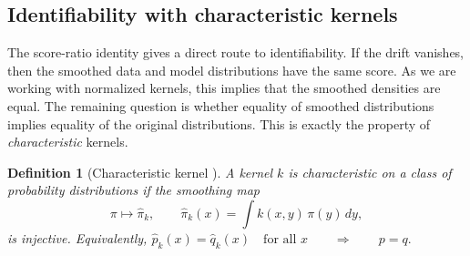 \documentclass{article}
\theoremstyle{plain}
\newtheorem{definition}[theorem]{Definition}
\begin{document}


\subsection{Identifiability with characteristic kernels}

The score-ratio identity gives a direct route to identifiability. If the drift
vanishes, then the smoothed data and model distributions have the same score. As we are working with normalized kernels, this implies that the smoothed densities are equal. The remaining question is whether equality of smoothed distributions implies equality of the original distributions. This is exactly the property of \textit{characteristic} kernels.


\begin{definition}[Characteristic kernel \cite{fukumizu2009characteristic}]
\label{def:characteristic_kernel}
A kernel \(k\) is characteristic on a class of probability distributions if the
smoothing map
\[
\pi
\mapsto
\widehat{\pi}_k,
\qquad
\widehat{\pi}_k(x)
=
\int k(x,y)\,\pi(y)\,dy,
\]
is injective. Equivalently, $
\widehat{p}_k(x)=\widehat{q}_k(x)
\quad \text{for all } x
\qquad
\Longrightarrow
\qquad
p=q.$
\end{definition}
\end{document}
